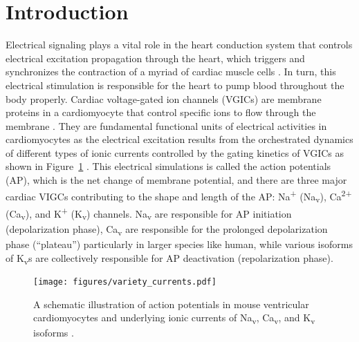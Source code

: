 \documentclass[utf8]{frontiersHLTH} %
\begin{document}
\section{Introduction}
Electrical signaling plays a vital role in the heart conduction system that controls electrical excitation propagation through the heart, which triggers and synchronizes the contraction of a myriad of cardiac muscle cells \cite{veeraraghavan2014mechanisms}. In turn, this electrical stimulation is responsible for the heart to pump blood throughout the body properly. Cardiac voltage-gated ion channels (VGICs) are membrane proteins in a cardiomyocyte that control specific ions to flow through the membrane \cite{bezanilla2005vgic}. They are fundamental functional units of electrical activities in cardiomyocytes as the electrical excitation results from the orchestrated dynamics of different types of ionic currents controlled by the gating kinetics of VGICs as shown in Figure~\ref{fig:variety_ionc} \cite{grant2009cardiac}. This electrical simulations is called the action potentials (AP), which is the net change of membrane potential, and there are three major cardiac VIGCs contributing to the shape and length of the AP: Na\textsuperscript{+}  (Na\textsubscript{v}), Ca\textsuperscript{2+}  (Ca\textsubscript{v}), and K\textsuperscript{+}  (K\textsubscript{v}) channels. Na\textsubscript{v} are responsible for AP initiation (depolarization phase), Ca\textsubscript{v} are responsible for the prolonged depolarization phase (``plateau'') particularly in larger species like human, while various isoforms of K\textsubscript{v}s are collectively responsible for AP deactivation (repolarization phase). 
\begin{figure}[!ht]
    \centering
    \texttt{[image: figures/variety\_currents.pdf]}
    \caption{A schematic illustration of action potentials in mouse ventricular cardiomyocytes and underlying ionic currents of Na\textsubscript{v}, Ca\textsubscript{v}, and K\textsubscript{v} isoforms \cite{nerbonne2003molecular}.}
    \label{fig:variety_ionc}
\end{figure}
\end{document}
